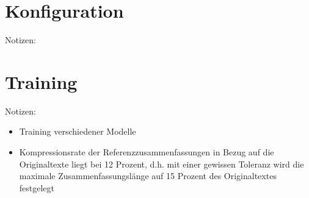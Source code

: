 \section{Konfiguration}
Notizen:


\section{Training}
Notizen:
\begin{itemize}
	\item Training verschiedener Modelle
	\item Kompressionsrate der Referenzzusammenfassungen in Bezug auf die Originaltexte liegt bei 12 Prozent, d.h. mit einer gewissen Toleranz wird die maximale Zusammenfassungslänge auf 15 Prozent des Originaltextes festgelegt
\end{itemize}


